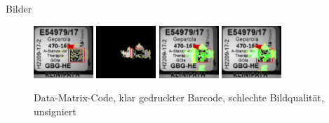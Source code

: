 \documentclass{beamer}
\begin{document}
  \begin{frame}{Bilder}
    \begin{figure}
      \includegraphics[width=0.2\textwidth]{./assets/E2017054979P1-a-2_GBG-HE_0000000000003162-label_top1_positiveonlywithrest.jpg}
      \hfill
      \includegraphics[width=0.2\textwidth]{./assets/E2017054979P1-a-2_GBG-HE_0000000000003162-label_top1_positiveonly.jpg}
      \hfill
      \includegraphics[width=0.2\textwidth]{./assets/E2017054979P1-a-2_GBG-HE_0000000000003162-label_top1_proscons.jpg}
      \hfill
      \includegraphics[width=0.2\textwidth]{./assets/E2017054979P1-a-2_GBG-HE_0000000000003162-label_top1_prosconsminweight.jpg}
      \caption{Data-Matrix-Code, klar gedruckter Barcode, schlechte Bildqualität, unsigniert}
    \end{figure}
  \end{frame}
\end{document}
